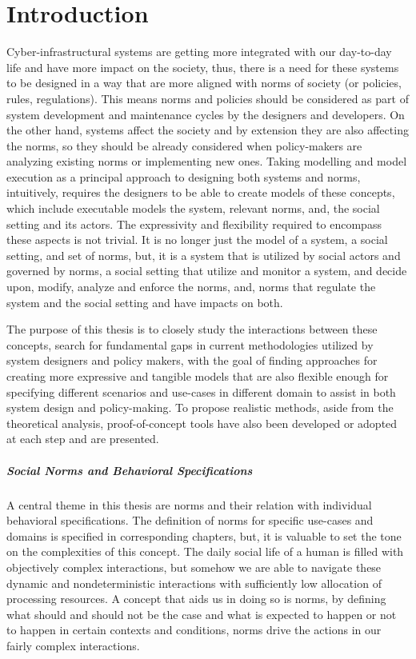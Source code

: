 \chapter{Introduction}
Cyber-infrastructural systems are getting more integrated with our day-to-day life and have more impact on the society, thus, there is a need for these systems to be designed in a way that are more aligned with norms of society (or policies, rules, regulations). This means norms and policies should be considered as part of system development and maintenance cycles by the designers and developers. On the other hand, systems affect the society and by extension they are also affecting the norms, so they should be already considered when policy-makers are analyzing existing norms or implementing new ones. Taking modelling and model execution as a principal approach to designing both systems and norms, intuitively, requires the designers to be able to create models of these concepts, which include executable models the system, relevant norms, and, the social setting and its actors. The expressivity and flexibility required to encompass these aspects is not trivial. It is no longer just the model of a system, a social setting, and set of norms, but, it is a system that is utilized by social actors and governed by norms, a social setting that utilize and monitor a system, and decide upon, modify, analyze and enforce the norms, and, norms that regulate the system and the social setting and have impacts on both.


The purpose of this thesis is to closely study the interactions between these concepts, search for fundamental gaps in current methodologies utilized by system designers and policy makers, with the goal of finding approaches for creating more expressive and tangible models that are also flexible enough for specifying different scenarios and use-cases in different domain to assist in both system design and policy-making. To propose realistic methods, aside from the theoretical analysis, proof-of-concept tools have also been developed or adopted at each step and are presented.


\paragraph{Social Norms and Behavioral Specifications}
A central theme in this thesis are norms and their relation with individual behavioral specifications. The definition of norms for specific use-cases and domains is specified in corresponding chapters, but, it is valuable to set the tone on the complexities of this concept. The daily social life of a human is filled with objectively complex interactions, but somehow we are able to navigate these dynamic and nondeterministic interactions with sufficiently low allocation of processing resources. A concept that aids us in doing so is norms, by defining what should and should not be the case and what is expected to happen or not to happen in certain contexts and conditions, norms drive the actions in our fairly complex interactions. 


